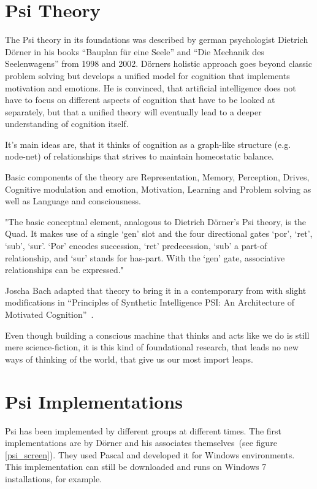 \section{Psi Theory}
The Psi theory in its foundations was described by german psychologist Dietrich Dörner in his books ``Bauplan für eine Seele'' and ``Die Mechanik des Seelenwagens'' from 1998 and 2002. Dörners holistic approach goes beyond classic problem solving but develops a unified model for cognition that implements motivation and emotions. He is convinced, that artificial intelligence does not have to focus on different aspects of cognition that have to be looked at separately, but that a unified theory will eventually lead to a deeper understanding of cognition itself.

It's main ideas are, that it thinks of cognition as a graph-like structure (e.g. node-net) of relationships that strives to maintain homeostatic balance.\cite{Bach:2009:PSI:1611304}

Basic components of the theory are Representation, Memory, Perception, Drives, Cognitive modulation and emotion, Motivation, Learning and Problem solving as well as Language and consciousness. %

"The basic conceptual element, analogous to Dietrich Dörner’s Psi theory, is the Quad. It makes use of a single ‘gen’ slot and the four directional gates ‘por’, ‘ret’, ‘sub’, ‘sur’. ‘Por’ encodes succession, ‘ret’ predecession, ‘sub’ a part-of relationship, and ‘sur’ stands for has-part. With the ‘gen’ gate, associative relationships can be expressed."


Joscha Bach adapted that theory to bring it in a contemporary from with slight modifications in ``Principles of Synthetic Intelligence PSI: An Architecture of Motivated Cognition''~\cite{Bach:2009:PSI:1611304}.


Even though building a conscious machine that thinks and acts like we do is still mere science-fiction, it is this kind of foundational research, that leads no new ways of thinking of the world, that give us our most import leaps.


    \section{Psi Implementations}
Psi has been implemented by different groups at different times. The first implementations are by Dörner and his associates themselves~(see figure \ref{psi_screen}). They used Pascal and developed it for Windows environments. This implementation can still be downloaded and runs on Windows 7 installations, for example.

